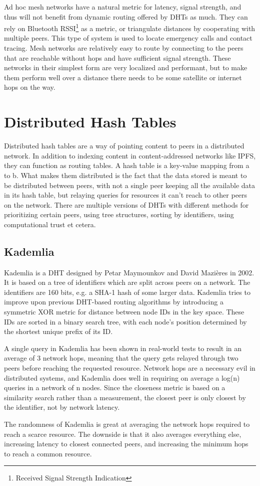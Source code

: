 Ad hoc mesh networks have a natural metric for latency, signal strength, and thus will not benefit from dynamic routing offered by DHTs as much. They can rely on Bluetooth RSSI\footnote{Received Signal Strength Indication} as a metric, or triangulate distances by cooperating with multiple peers. This type of system is used to locate emergency calls and contact tracing.\cite{theintercept} Mesh networks are relatively easy to route by connecting to the peers that are reachable without hops and have sufficient signal strength. These networks in their simplest form are very localized and performant, but to make them perform well over a distance there needs to be some satellite or internet hops on the way. 

\section{Distributed Hash Tables}
Distributed hash tables are a way of pointing content to peers in a distributed network. In addition to indexing content in content-addressed networks like IPFS, they can function as routing tables. A hash table is a key-value mapping from a to b. What makes them distributed is the fact that the data stored is meant to be distributed between peers, with not a single peer keeping all the available data in its hash table, but relaying queries for resources it can't reach to other peers on the network. There are multiple versions of DHTs with different methods for prioritizing certain peers, using tree structures, sorting by identifiers, using computational trust et cetera. 
						
\subsection{Kademlia}
Kademlia is a DHT designed by Petar Maymounkov and David Mazières in 2002. It is based on a tree of identifiers which are split across peers on a network. The identifiers are 160 bits, e.g. a SHA-1 hash of some larger data. Kademlia tries to improve upon previous DHT-based routing algorithms by introducing a symmetric XOR metric for distance between node IDs in the key space.\cite{Petar_Maymounkov2020-sx} These IDs are sorted in a binary search tree, with each node's position determined by the shortest unique prefix of its ID.
						
A single query in Kademlia has been shown in real-world tests to result in an average of 3 network hops, meaning that the query gets relayed through two peers before reaching the requested resource.\cite{Roos2013-mb} Network hops are a necessary evil in distributed systems, and Kademlia does well in requiring on average a log(n) queries in a network of n nodes. Since the closeness metric is based on a similarity search rather than a measurement, the closest peer is only closest by the identifier, not by network latency.\cite{Eigenmann2020-zm}
						
The randomness of Kademlia is great at averaging the network hops required to reach a scarce resource. The downside is that it also averages everything else, increasing latency to closest connected peers, and increasing the minimum hops to reach a common resource.
